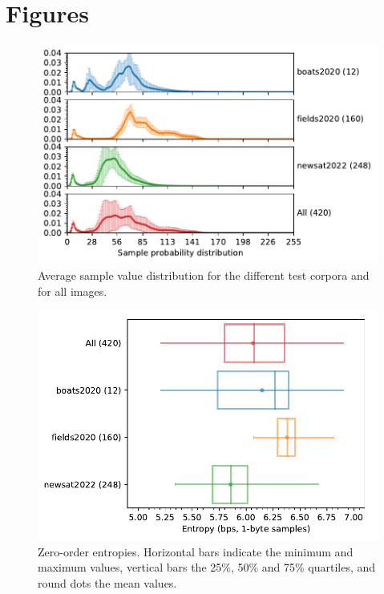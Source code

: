 \documentclass{class/technicalReportUAB}
\begin{document}
\appendix
\section{Figures}\label{sec:figures}

\begin{figure}[h]
\begin{center}
\includegraphics[width=\linewidth]{./plots/dataset_analysis/DictNumericAnalyzer-sample_distribution-line-groupby__corpus.pdf}
\end{center}
\caption{Average sample value distribution for the different test corpora and for all images.}
\label{fig:sample_distribution}
\end{figure}

\begin{figure}[h]
\begin{center}
\includegraphics[width=0.75\linewidth]{./plots/dataset_analysis/ScalarNumericAnalyzer-entropy_1B_bps-boxplot-groupby__corpus.pdf}
\end{center}
\caption{Zero-order entropies. Horizontal bars indicate the minimum and maximum values, vertical bars the 25\%, 50\% and 75\% quartiles, and round dots the mean values.}
\label{fig:entropy}
\end{figure}
\end{document}
